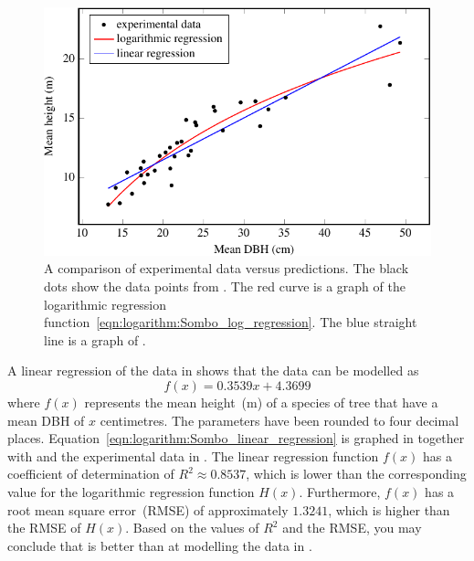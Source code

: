 \documentclass[a4paper,oneside,12pt]{article}
\begin{document}
{\begin{solution}
\begin{figure}[!htbp]
\centering
\includegraphics[scale=1.1]{image/12/sombo.pdf}
\caption{%
  A comparison of experimental data versus predictions.  The black
  dots show the data points from .  The red
  curve is a graph of the logarithmic regression
  function~\eqref{eqn:logarithm:Sombo_log_regression}.  The blue
  straight line is a graph of
  .
}
\label{fig:logarithm:Sombo_log_regression}
\end{figure}

A linear regression of the data in  shows
that the data can be modelled as
\begin{equation}
\label{eqn:logarithm:Sombo_linear_regression}
f(x)
=
0.3539 x + 4.3699
\end{equation}
where $f(x)$ represents the mean height~(m) of a species of tree that
have a mean DBH of $x$ centimetres.  The parameters have been rounded
to four decimal places.
Equation~\eqref{eqn:logarithm:Sombo_linear_regression} is graphed in
 together with
 and the experimental
data in .  The linear regression function
$f(x)$ has a coefficient of determination of $R^2 \approx 0.8537$,
which is lower than the corresponding value for the logarithmic
regression function $H(x)$.  Furthermore, $f(x)$ has a root mean
square error~(RMSE) of approximately $1.3241$, which is higher than
the RMSE of $H(x)$.  Based on the values of $R^2$ and the RMSE, you
may conclude that  is
better than  at
modelling the data in .
\end{solution}
}{}
\end{document}
